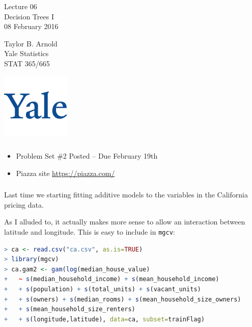\documentclass[xetex,mathserif,serif,aspectratio=169]{beamer}
\begin{document}
\begin{frame}[fragile] \frametitle{} \oldB \small

\vfill

{\fontsize{0.7cm}{0cm}\selectfont Lecture 06 \\\vspace{0.2cm} Decision Trees I}\\\vspace{0.5cm}
08 February 2016

\vspace{2cm}

\begin{minipage}{0.6\textwidth}
Taylor B. Arnold \\
Yale Statistics \\
STAT 365/665
\end{minipage}
\hfill
\begin{minipage}{0.3\textwidth}\raggedleft
\includegraphics[scale=0.3]{../yale-logo.png}
\end{minipage}%

\end{frame}

\begin{frame}[fragile] \frametitle{} \oldB \small

\begin{itemize}
\item Problem Set \#2 Posted -- Due February 19th
\item Piazza site \url{https://piazza.com/}
\end{itemize}

\end{frame}

\begin{frame}[fragile] \frametitle{} \oldB \small

Last time we starting fitting additive models to the variables
in the California pricing data.

As I alluded to, it actually makes more sense to allow an
interaction between latitude and longitude. This is easy
to include in \texttt{mgcv}:
\begin{lstlisting}[language=R, basicstyle=\ttfamily]
> ca <- read.csv("ca.csv", as.is=TRUE)
> library(mgcv)
> ca.gam2 <- gam(log(median_house_value)
+   ~ s(median_household_income) + s(mean_household_income)
+   + s(population) + s(total_units) + s(vacant_units)
+   + s(owners) + s(median_rooms) + s(mean_household_size_owners)
+   + s(mean_household_size_renters)
+   + s(longitude,latitude), data=ca, subset=trainFlag)
\end{lstlisting}

\end{frame}
\end{document}
